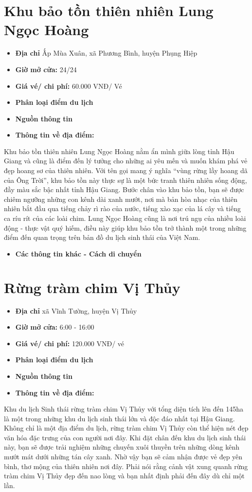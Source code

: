 \documentclass{article}
\begin{document}
\section{Khu bảo tồn thiên nhiên Lung Ngọc Hoàng}
\begin{itemize}
    \item{\textbf{Địa chỉ}} Ấp Mùa Xuân, xã Phương Bình, huyện Phụng Hiệp
    \item{\textbf{Giờ mở cửa:}} 24/24
    \item{\textbf{Giá vé/ chi phí:}} 60.000 VNĐ/ Vé
    \item{\textbf{Phân loại điểm du lịch} }
    \item{\textbf{Nguồn thông tin}}
    \item{\textbf{Thông tin về địa điểm:}}
\end{itemize}
Khu bảo tồn thiên nhiên Lung Ngọc Hoàng nằm ẩn mình giữa lòng tỉnh Hậu Giang và cũng là điểm đến lý tưởng cho những ai yêu mến và muốn khám phá vẻ đẹp hoang sơ của thiên nhiên. Với tên gọi mang ý nghĩa “vùng rừng lầy hoang dã của Ông Trời”, khu bảo tồn này thực sự là một bức tranh thiên nhiên sống động, đầy màu sắc bậc nhất tỉnh Hậu Giang.
Bước chân vào khu bảo tồn, bạn sẽ được chiêm ngưỡng những con kênh dài xanh mướt, nơi mà bản hòa nhạc của thiên nhiên bắt đầu qua tiếng chảy rì rào của nước, tiếng xào xạc của lá cây và tiếng ca ríu rít của các loài chim. Lung Ngọc Hoàng cũng là nơi trú ngụ của nhiều loài động - thực vật quý hiếm, điều này giúp khu bảo tồn trở thành một trong những điểm đến quan trọng trên bản đồ du lịch sinh thái của Việt Nam.

\begin{itemize}
    \item{\textbf{Các thông tin khác - Cách di chuyển}}
\end{itemize}

\section{Rừng tràm chim Vị Thủy}
\begin{itemize}
    \item{\textbf{Địa chỉ}} xã Vĩnh Tường, huyện Vị Thủy
    \item{\textbf{Giờ mở cửa:}} 6:00 - 16:00
    \item{\textbf{Giá vé/ chi phí:}} 120.000 VNĐ/ vé
    \item{\textbf{Phân loại điểm du lịch} }
    \item{\textbf{Nguồn thông tin}}
    \item{\textbf{Thông tin về địa điểm:}}
\end{itemize}
Khu du lịch Sinh thái rừng tràm chim Vị Thủy với tổng diện tích lên đến 145ha là một trong những khu du lịch sinh thái lớn và độc đáo nhất tại Hậu Giang. Không chỉ là một địa điểm du lịch, rừng tràm chim Vị Thủy còn thể hiện nét đẹp văn hóa đặc trưng của con người nơi đây.
Khi đặt chân đến khu du lịch sinh thái này, bạn sẽ được trải nghiệm những chuyến xuôi thuyền trên những dòng kênh mướt mát dưới những tán cây xanh. Nhờ vậy bạn sẽ cảm nhận được vẻ đẹp yên bình, thơ mộng của thiên nhiên nơi đây. Phải nói rằng cảnh vật xung quanh rừng tràm chim Vị Thủy đẹp đến nao lòng và bạn nhất định phải đến đây dù chỉ một lần.
\end{document}
